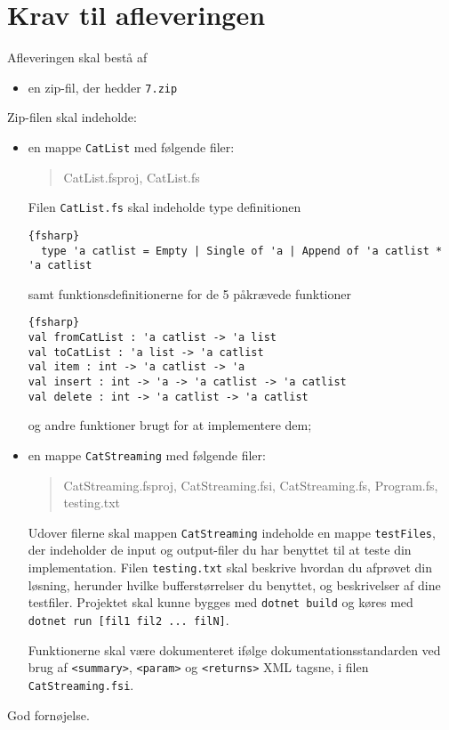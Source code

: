 \documentclass[a4paper,12pt]{article}
\newcommand{\exerciseNumber}{7}
\begin{document}
\section*{Krav til afleveringen}

Afleveringen skal bestå af
\begin{itemize}
  \item en zip-fil, der hedder \texttt{\exerciseNumber\typeLetter.zip}
\end{itemize}
Zip-filen skal indeholde:
\begin{itemize}
\item en mappe \texttt{CatList} med følgende filer:
  \begin{quote}
    CatList.fsproj, CatList.fs
  \end{quote}
  Filen \verb|CatList.fs| skal indeholde type definitionen
  \begin{lstlisting}{fsharp}
  type 'a catlist = Empty | Single of 'a | Append of 'a catlist * 'a catlist
  \end{lstlisting}
  samt funktionsdefinitionerne for de 5 p\aa kr\ae vede funktioner 
  \begin{lstlisting}{fsharp}
val fromCatList : 'a catlist -> 'a list
val toCatList : 'a list -> 'a catlist
val item : int -> 'a catlist -> 'a
val insert : int -> 'a -> 'a catlist -> 'a catlist
val delete : int -> 'a catlist -> 'a catlist
\end{lstlisting}
og andre funktioner brugt for at implementere dem;
\item en mappe \texttt{CatStreaming} med følgende filer:
  \begin{quote}
    CatStreaming.fsproj, CatStreaming.fsi, CatStreaming.fs, Program.fs, testing.txt
  \end{quote}
  Udover filerne skal mappen \texttt{CatStreaming} indeholde en mappe \texttt{testFiles}, der indeholder de input og output-filer du har benyttet til at teste din implementation. Filen \texttt{testing.txt} skal beskrive hvordan du afprøvet din løsning, herunder hvilke bufferstørrelser du benyttet, og beskrivelser af dine testfiler. 
  Projektet skal kunne bygges med \texttt{dotnet build} og køres med \\ \texttt{dotnet run [fil1 fil2 ... filN]}.
  
  Funktionerne skal være dokumenteret ifølge dokumentationsstandarden ved brug af \verb|<summary>|, \verb|<param>| og \verb|<returns>| XML tagsne, i filen \texttt{CatStreaming.fsi}.
\end{itemize}

\flushright God fornøjelse.
\end{document}

